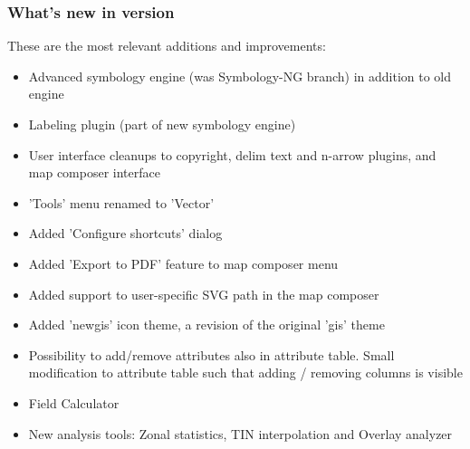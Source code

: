\subsubsection{What's new in version \CURRENT} 

These are the most relevant additions and improvements:
\begin{itemize}[label=--]
 \item Advanced symbology engine (was Symbology-NG branch) in addition to old engine
 \item Labeling plugin (part of new symbology engine)
 \item User interface cleanups to copyright, delim text and n-arrow plugins, and map composer interface
 \item 'Tools' menu renamed to 'Vector' 
 \item Added 'Configure shortcuts' dialog 
 \item Added 'Export to PDF' feature to map composer menu 
 \item Added support to user-specific SVG path in the map composer 
 \item Added 'newgis' icon theme, a revision of the original 'gis' theme
 \item Possibility to add/remove attributes also in attribute table. Small modification to attribute table such that adding / removing columns is visible
 \item Field Calculator
 \item New analysis tools: Zonal statistics, TIN interpolation and Overlay analyzer
\end{itemize}
